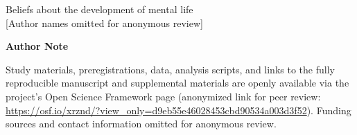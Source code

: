 \begin{titlepage}
    \begin{center}
        \vspace*{1in}
        {\Large Beliefs about the development of mental life} \\[2cm]
        
        [Author names omitted for anonymous review]
    
    \end{center}
    \vfill
    \textbf{Author Note} \\
    \setlength{\parindent}{2em}

    \indent Study materials, preregistrations, data, analysis scripts, and links to the fully reproducible manuscript and supplemental materials are openly available via the project’s Open Science Framework page (anonymized link for peer review: \url{https://osf.io/xrznd/?view_only=d9eb55e46028453cbd90534a003d3f52}). Funding sources and contact information omitted for anonymous review.
    
\end{titlepage}
